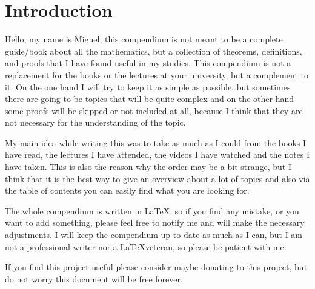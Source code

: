 \newpage
\section{Introduction}

Hello, my name is Miguel, this compendium is not meant to be a complete 
guide/book about all the mathematics,
but a collection of theorems, definitions, and proofs that I have found useful in my studies.
This compendium is not a replacement for the books or the lectures at your university, but a complement 
to it. On the one hand I will try to keep it as simple as possible, but sometimes there are going to be 
topics that will be quite complex and on the other hand some proofs will be skipped or not included at 
all, because I think that they are not necessary for the understanding of the topic.

My main idea while writing this was to take as much as I could from the books I have read, the lectures 
I have attended, the videos I have watched 
and the notes I have taken. This is also the reason why the order may be a bit strange, 
but I think that it is the best way to give an overview about a lot of topics and also 
via the table of contents you can
easily find what you are looking for.

The whole compendium is written in \LaTeX, so if you find any mistake, or you want to add something, please 
feel free to notify me and will make the necessary adjustments.
I will keep the compendium up to date as much as 
I can, but I am not a professional writer nor a \LaTeX veteran, so please be patient with me.

If you find this project useful please consider maybe donating
to this project, but do not worry this document will be free forever.
